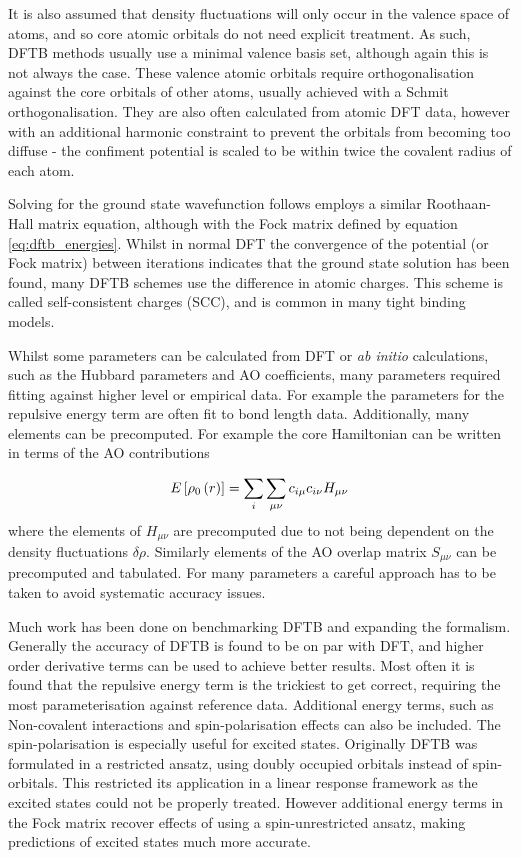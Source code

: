 It is also assumed that density fluctuations will only occur in the valence space
of atoms, and so core atomic orbitals do not need explicit treatment. As such, DFTB
methods usually use a minimal valence basis set\cite{Bannwarth2020}, although again 
this is not always the case. These valence atomic orbitals require orthogonalisation
against the core orbitals of other atoms, usually achieved with a Schmit orthogonalisation.
They are also often calculated from atomic DFT data, however with an additional 
harmonic constraint to prevent the orbitals from becoming too diffuse - the confiment
potential is scaled to be within twice the covalent radius of each atom.

Solving for the ground state wavefunction follows employs a similar Roothaan-Hall 
matrix equation, although with the Fock matrix defined by equation \ref{eq:dftb_energies}.
Whilst in normal DFT the convergence of the potential (or Fock matrix) between iterations
indicates that the ground state solution has been found, many DFTB schemes use the
difference in atomic charges. This scheme is called self-consistent charges (SCC),
and is common in many tight binding models.

Whilst some parameters can be calculated from DFT or \emph{ab initio} calculations,
such as the Hubbard parameters and AO coefficients, many parameters required fitting
against higher level or empirical data. For example the parameters for the repulsive
energy term are often fit to bond length data. Additionally, many elements can be
precomputed. For example the core Hamiltonian can be written in terms of the AO
contributions 

\begin{equation}
    E_{} \left[ \rho_0\left(r\right) \right] = \sum_i \sum_{\mu\nu} c_{i\mu}c_{i\nu} H_{\mu\nu}
\end{equation}
%
where the elements of $H_{\mu\nu}$ are precomputed due to not being dependent on
the density fluctuations $\delta \rho$. Similarly elements of the AO overlap matrix
$S_{\mu\nu}$ can be precomputed and tabulated. For many parameters a careful approach
has to be taken to avoid systematic accuracy issues.

Much work has been done on benchmarking DFTB and expanding the formalism. Generally
the accuracy of DFTB is found to be on par with DFT, and higher order derivative 
terms can be used to achieve better results. Most often it is found that the repulsive
energy term is the trickiest to get correct, requiring the most parameterisation
against reference data. Additional energy terms, such as Non-covalent interactions 
and spin-polarisation effects can also be included. The spin-polarisation is especially
useful for excited states. Originally DFTB was formulated in a restricted ansatz,
using doubly occupied orbitals instead of spin-orbitals. This restricted its application
in a linear response framework as the excited states could not be properly treated.
However additional energy terms in the Fock matrix recover effects of using a spin-unrestricted
ansatz, making predictions of excited states much more accurate.

